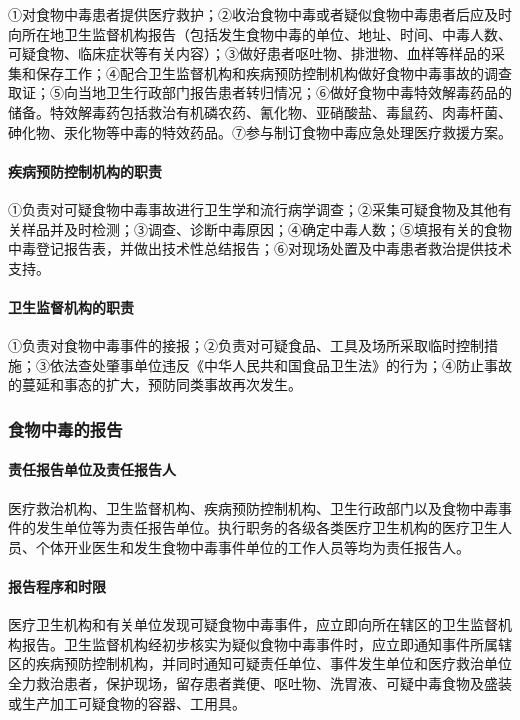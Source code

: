 ①对食物中毒患者提供医疗救护；②收治食物中毒或者疑似食物中毒患者后应及时向所在地卫生监督机构报告（包括发生食物中毒的单位、地址、时间、中毒人数、可疑食物、临床症状等有关内容）；③做好患者呕吐物、排泄物、血样等样品的采集和保存工作；④配合卫生监督机构和疾病预防控制机构做好食物中毒事故的调查取证；⑤向当地卫生行政部门报告患者转归情况；⑥做好食物中毒特效解毒药品的储备。特效解毒药包括救治有机磷农药、氰化物、亚硝酸盐、毒鼠药、肉毒杆菌、砷化物、汞化物等中毒的特效药品。⑦参与制订食物中毒应急处理医疗救援方案。

\paragraph{疾病预防控制机构的职责}

①负责对可疑食物中毒事故进行卫生学和流行病学调查；②采集可疑食物及其他有关样品并及时检测；③调查、诊断中毒原因；④确定中毒人数；⑤填报有关的食物中毒登记报告表，并做出技术性总结报告；⑥对现场处置及中毒患者救治提供技术支持。

\paragraph{卫生监督机构的职责}

①负责对食物中毒事件的接报；②负责对可疑食品、工具及场所采取临时控制措施；③依法查处肇事单位违反《中华人民共和国食品卫生法》的行为；④防止事故的蔓延和事态的扩大，预防同类事故再次发生。

\subsubsection{食物中毒的报告}

\paragraph{责任报告单位及责任报告人}

医疗救治机构、卫生监督机构、疾病预防控制机构、卫生行政部门以及食物中毒事件的发生单位等为责任报告单位。执行职务的各级各类医疗卫生机构的医疗卫生人员、个体开业医生和发生食物中毒事件单位的工作人员等均为责任报告人。

\paragraph{报告程序和时限}

医疗卫生机构和有关单位发现可疑食物中毒事件，应立即向所在辖区的卫生监督机构报告。卫生监督机构经初步核实为疑似食物中毒事件时，应立即通知事件所属辖区的疾病预防控制机构，并同时通知可疑责任单位、事件发生单位和医疗救治单位全力救治患者，保护现场，留存患者粪便、呕吐物、洗胃液、可疑中毒食物及盛装或生产加工可疑食物的容器、工用具。

